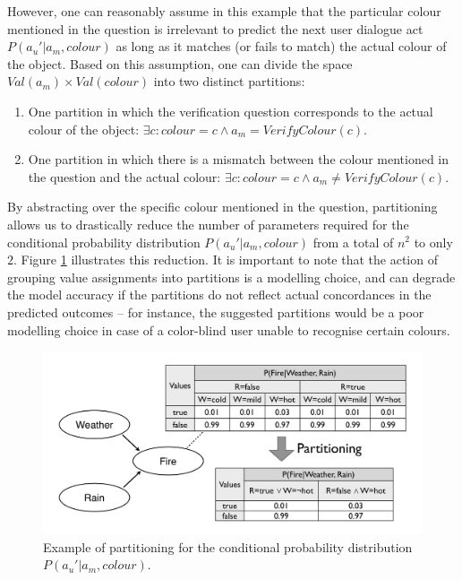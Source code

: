 However, one can reasonably assume in this example that the particular colour mentioned in the question is irrelevant to predict the next user dialogue act $P(a_u'|a_m,\mathit{colour})$ as long as it matches (or fails to match) the actual colour of the object.  Based on this assumption, one can divide the space $Val(a_m) \times Val(\mathit{colour})$ into two distinct partitions: 
\begin{enumerate}
\item One partition in which the verification question corresponds to the actual colour of the object: $\exists c: colour\!=\!c \land a_m\!=\!\mathit{VerifyColour(c)}$.
\item One partition in which there is a mismatch between the colour mentioned in the question and the actual colour: $\exists c: colour\!=\!c \land a_m\!\neq\!\mathit{VerifyColour(c)}$.
\end{enumerate}

By abstracting over the specific colour mentioned in the question, partitioning allows us to drastically reduce the number of parameters required for the conditional probability distribution $P(a_u'|a_m,\mathit{colour})$ from a total of $n^2$ to only $2$. Figure \ref{fig:partitioning} illustrates this reduction. It is important to note that the action of grouping value assignments into partitions is a modelling choice, and can degrade the model accuracy if the partitions do not reflect actual concordances in the predicted outcomes -- for instance, the suggested partitions would be a poor modelling choice in case of a color-blind user unable to recognise certain colours. 

 \begin{figure}[h]
\centering
\includegraphics[scale=0.25]{imgs/partitioning.pdf}
\caption{Example of partitioning for the conditional probability distribution $P(a_u'|a_m,\mathit{colour})$.}
\label{fig:partitioning}
\end{figure}

